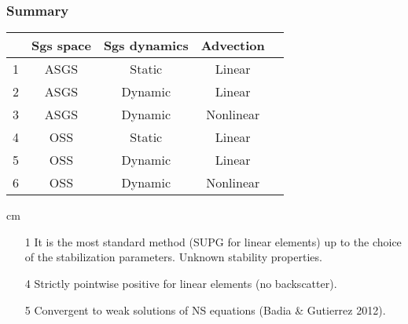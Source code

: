 \begin{frame}[t]
\frametitle{Summary}

\begin{table}[h]
\centering
\begin{tabular}{|c|c|c|c|c|}
\hline
& Sgs space & Sgs dynamics  &  Advection\\
\hline
1&ASGS      & Static  &  Linear    \\
2&ASGS      & Dynamic &  Linear    \\
3&ASGS      & Dynamic &  Nonlinear \\
\hline
4&OSS      & Static  &  Linear   \\
5&OSS      & Dynamic &  Linear   \\
6&OSS      & Dynamic &  Nonlinear \\
\hline
\end{tabular}
\end{table}
 cm
\begin{itemize}
\item[1] It is the most standard method (SUPG for linear elements) up to the choice of the
stabilization parameters. Unknown stability properties.
\item[4] Strictly pointwise positive for linear elements (no backscatter).
\item[5] Convergent to weak solutions of NS equations (Badia \& Gutierrez 2012).
\end{itemize}
\end{frame}
